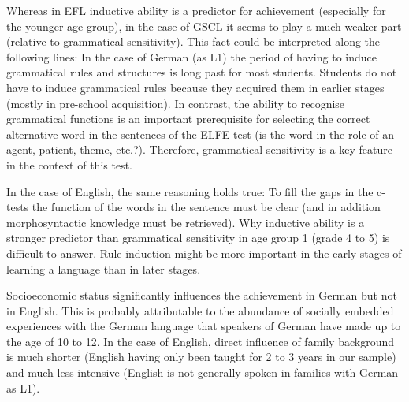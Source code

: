 \documentclass[output=paper]{langsci/langscibook}
\begin{document}
Whereas in EFL inductive ability is a predictor for achievement (especially for the younger age group), in the case of GSCL it seems to play a much weaker part (relative to grammatical sensitivity). This fact could be interpreted along the following lines: In the case of German (as L1) the period of having to induce grammatical rules and structures is long past for most students. Students do not have to induce grammatical rules because they acquired them in earlier stages (mostly in pre-school acquisition). In contrast, the ability to recognise grammatical functions is an important prerequisite for selecting the correct alternative word in the sentences of the ELFE-test (is the word in the role of an agent, patient, theme, etc.?). Therefore, grammatical sensitivity is a key feature in the context of this test.

In the case of English, the same reasoning holds true: To fill the gaps in the c-tests the function of the words in the sentence must be clear (and in addition morphosyntactic knowledge must be retrieved). Why inductive ability is a stronger predictor than grammatical sensitivity in age group 1 (grade 4 to 5) is difficult to answer. Rule induction might be more important in the early stages of learning a language than in later stages.

Socioeconomic status significantly influences the achievement in German but not in English. This is probably attributable to the abundance of socially embedded experiences with the German language that speakers of German have made up to the age of 10 to 12. In the case of English, direct influence of family background is much shorter (English having only been taught for 2 to 3 years in our sample) and much less intensive (English is not generally spoken in families with German as L1). 
\end{document}
